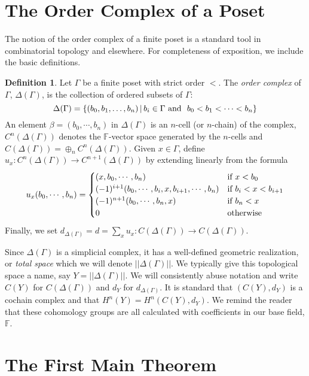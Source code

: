 \documentclass[11pt,righttag]{amsart}
\theoremstyle{definition}
\newtheorem{defn}[thm]{Definition}
\begin{document}
\section{The Order Complex of a Poset}

The notion of the order complex of a finite poset is a standard tool in combinatorial topology and elsewhere.  For completeness of exposition, we include the basic definitions.    

\begin{defn}   Let $\Gamma$ be a finite poset with strict order $<$.  The {\it order complex} of $\Gamma$, $\Delta(\Gamma)$, is the collection of ordered subsets of $\Gamma$:
$$\Delta(\Gamma)= \{ (b_0,b_1,\ldots,b_n)\,|\,  b_i \in \Gamma \hbox{\ and \ } b_0<b_1<\cdots< b_n\}$$ 
 An element $\beta=(b_0,\cdots,b_n)$ in $\Delta(\Gamma)$ is an $n$-cell (or $n$-chain) of the complex, 
 $C^n(\Delta(\Gamma))$ denotes the ${{\mathbb F}}$-vector space generated by the $n$-cells and $C(\Delta(\Gamma)) = \oplus_nC^n(\Delta(\Gamma))$.  Given $x\in \Gamma$, define 
 $u_x:C^n(\Delta(\Gamma))\to C^{n+1}(\Delta(\Gamma))$ by extending linearly from the formula
$$u_x(b_0,\cdots,b_n) = \begin{cases} 
		(x,b_0,\cdots,b_n) & \hbox{if\ } x<b_0\\ 
		(-1)^{i+1} (b_0,\cdots,b_i,x,b_{i+1},\cdots,b_n) & \hbox{if\ } b_i<x<b_{i+1}\\ 
		(-1)^{n+1}(b_0,\cdots, b_n,x) & \hbox{if\ } b_n<x\\
		0 & \hbox{otherwise\ } \\  
\end{cases}$$
Finally, we set $d_{\Delta(\Gamma)} = d = \sum_x u_x:C(\Delta(\Gamma)) \to C(\Delta(\Gamma))$.
\end{defn}

Since $\Delta(\Gamma)$ is a simplicial complex, it has a well-defined geometric realization, or {\it total space} which we will denote $||\Delta(\Gamma)||$.  We typically give this topological space a name, say $Y = ||\Delta(\Gamma)||$.   We will consistently abuse notation and write $C(Y)$ for $C(\Delta(\Gamma))$ and $d_Y$ for $d_{\Delta(\Gamma)}$.  It is standard that  $(C(Y),d_Y)$ is a cochain complex and that $H^n(Y) = H^n(C(Y),d_Y)$.   We remind the reader that these cohomology groups are all calculated with coefficients in our base field, ${{\mathbb F}}$.  

\section{The First Main Theorem}
\end{document}
